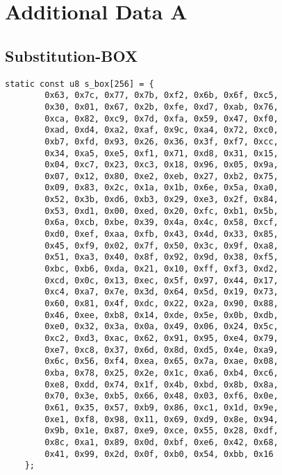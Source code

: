 \chapter{Additional Data A}

\section{Substitution-BOX}
\hypertarget{s-box}{}

\begin{lstlisting}[style=C, caption={S-Box},captionpos=t]
	static const u8 s_box[256] = {
		0x63, 0x7c, 0x77, 0x7b, 0xf2, 0x6b, 0x6f, 0xc5,
		0x30, 0x01, 0x67, 0x2b, 0xfe, 0xd7, 0xab, 0x76,
		0xca, 0x82, 0xc9, 0x7d, 0xfa, 0x59, 0x47, 0xf0,
		0xad, 0xd4, 0xa2, 0xaf, 0x9c, 0xa4, 0x72, 0xc0,
		0xb7, 0xfd, 0x93, 0x26, 0x36, 0x3f, 0xf7, 0xcc,
		0x34, 0xa5, 0xe5, 0xf1, 0x71, 0xd8, 0x31, 0x15,
		0x04, 0xc7, 0x23, 0xc3, 0x18, 0x96, 0x05, 0x9a,
		0x07, 0x12, 0x80, 0xe2, 0xeb, 0x27, 0xb2, 0x75,
		0x09, 0x83, 0x2c, 0x1a, 0x1b, 0x6e, 0x5a, 0xa0,
		0x52, 0x3b, 0xd6, 0xb3, 0x29, 0xe3, 0x2f, 0x84,
		0x53, 0xd1, 0x00, 0xed, 0x20, 0xfc, 0xb1, 0x5b,
		0x6a, 0xcb, 0xbe, 0x39, 0x4a, 0x4c, 0x58, 0xcf,
		0xd0, 0xef, 0xaa, 0xfb, 0x43, 0x4d, 0x33, 0x85,
		0x45, 0xf9, 0x02, 0x7f, 0x50, 0x3c, 0x9f, 0xa8,
		0x51, 0xa3, 0x40, 0x8f, 0x92, 0x9d, 0x38, 0xf5,
		0xbc, 0xb6, 0xda, 0x21, 0x10, 0xff, 0xf3, 0xd2,
		0xcd, 0x0c, 0x13, 0xec, 0x5f, 0x97, 0x44, 0x17,
		0xc4, 0xa7, 0x7e, 0x3d, 0x64, 0x5d, 0x19, 0x73,
		0x60, 0x81, 0x4f, 0xdc, 0x22, 0x2a, 0x90, 0x88,
		0x46, 0xee, 0xb8, 0x14, 0xde, 0x5e, 0x0b, 0xdb,
		0xe0, 0x32, 0x3a, 0x0a, 0x49, 0x06, 0x24, 0x5c,
		0xc2, 0xd3, 0xac, 0x62, 0x91, 0x95, 0xe4, 0x79,
		0xe7, 0xc8, 0x37, 0x6d, 0x8d, 0xd5, 0x4e, 0xa9,
		0x6c, 0x56, 0xf4, 0xea, 0x65, 0x7a, 0xae, 0x08,
		0xba, 0x78, 0x25, 0x2e, 0x1c, 0xa6, 0xb4, 0xc6,
		0xe8, 0xdd, 0x74, 0x1f, 0x4b, 0xbd, 0x8b, 0x8a,
		0x70, 0x3e, 0xb5, 0x66, 0x48, 0x03, 0xf6, 0x0e,
		0x61, 0x35, 0x57, 0xb9, 0x86, 0xc1, 0x1d, 0x9e,
		0xe1, 0xf8, 0x98, 0x11, 0x69, 0xd9, 0x8e, 0x94,
		0x9b, 0x1e, 0x87, 0xe9, 0xce, 0x55, 0x28, 0xdf,
		0x8c, 0xa1, 0x89, 0x0d, 0xbf, 0xe6, 0x42, 0x68,
		0x41, 0x99, 0x2d, 0x0f, 0xb0, 0x54, 0xbb, 0x16
	};
\end{lstlisting}

